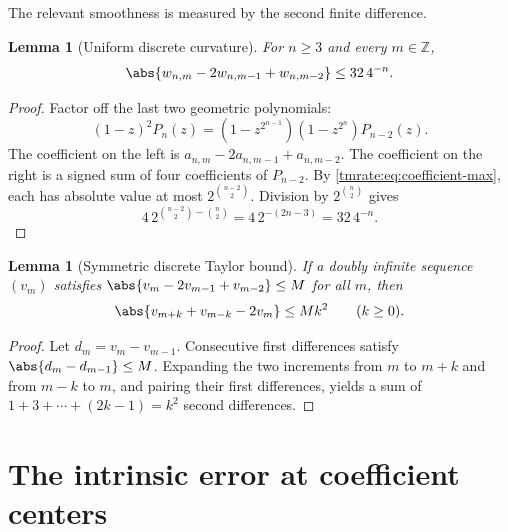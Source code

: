\documentclass[11pt,oneside]{article}
\newtheorem{lemma}[theorem]{Lemma}
\theoremstyle{definition}
\theoremstyle{remark}
\newcommand{\Z}{\mathbb Z}
\begin{document}
The relevant smoothness is measured by the second finite difference.

\begin{lemma}[Uniform discrete curvature]
\label{tmrate:lem:discrete-curvature}
For $n\ge3$ and every $m\in\Z$,
\begin{equation}
 \abs{w_{n,m}-2w_{n,m-1}+w_{n,m-2}}
 \le 32\,4^{-n}.                                          \label{tmrate:eq:curvature-bound}
\end{equation}
\end{lemma}

\begin{proof}
Factor off the last two geometric polynomials:
\begin{equation}
 (1-z)^2P_n(z)
 =(1-z^{2^{n-1}})(1-z^{2^n})P_{n-2}(z).                   \label{tmrate:eq:second-difference-product}
\end{equation}
The coefficient on the left is
$a_{n,m}-2a_{n,m-1}+a_{n,m-2}$.  The coefficient on the right is a signed sum
of four coefficients of $P_{n-2}$.  By \eqref{tmrate:eq:coefficient-max}, each has
absolute value at most $2^{\binom{n-2}{2}}$.  Division by
$2^{\binom n2}$ gives
\begin{equation*}
 4\,2^{\binom{n-2}{2}-\binom n2}
 =4\,2^{-(2n-3)}=32\,4^{-n}.
\end{equation*}
\end{proof}

\begin{lemma}[Symmetric discrete Taylor bound]
\label{tmrate:lem:symmetric-discrete-taylor}
If a doubly infinite sequence $(v_m)$ satisfies
$\abs{v_m-2v_{m-1}+v_{m-2}}\le M$ for all $m$, then
\begin{equation}
 \abs{v_{m+k}+v_{m-k}-2v_m}\le Mk^2
 \qquad(k\ge0).                                           \label{tmrate:eq:symmetric-second-difference}
\end{equation}
\end{lemma}

\begin{proof}
Let $d_m=v_m-v_{m-1}$.  Consecutive first differences satisfy
$\abs{d_m-d_{m-1}}\le M$.  Expanding the two increments from $m$ to $m+k$ and
from $m-k$ to $m$, and pairing their first differences, yields a sum of
$1+3+\cdots+(2k-1)=k^2$ second differences.
\end{proof}

\section{The intrinsic error at coefficient centers}
\label{tmrate:sec:center-error}
\end{document}
